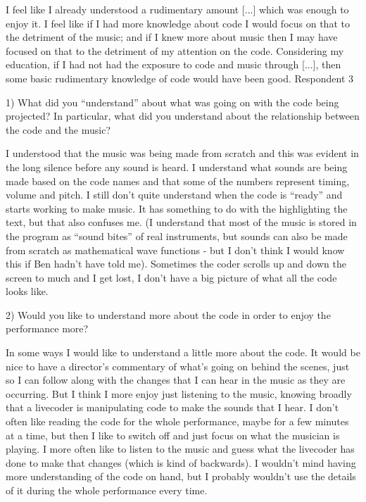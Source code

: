 I feel like I already understood a rudimentary amount [...] which was enough to enjoy it.  I feel like if I had more knowledge about code I would focus on that to the detriment of the music; and if I knew more about music then I may have focused on that to the detriment of my attention on the code.  Considering my education, if I had not had the exposure to code and music through [...], then some basic rudimentary knowledge of code would have been good.
Respondent 3

1) What did you ``understand'' about what was going on with the code being projected? In particular, what did you understand about the relationship between the code and the music?

I understood that the music was being made from scratch and this was evident in the long silence before any sound is heard. I understand what sounds are being made based on the code names and that some of the numbers represent timing, volume and pitch.  I still don't quite understand when the code is ``ready'' and starts working to make music. It has something to do with the highlighting the text, but that also confuses me. (I understand that most of the music is stored in the program as ``sound bites'' of real instruments, but sounds can also be made from scratch as mathematical wave functions - but I don't think I would know this if Ben hadn't have told me). Sometimes the coder scrolls up and down the screen to much and I get lost, I don't have a big picture of what all the code looks like.

2) Would you like to understand more about the code in order to enjoy the performance more?

In some ways I would like to understand a little more about the code. It would be nice to have a director's commentary of what's going on behind the scenes, just so I can follow along with the changes that I can hear in the music as they are occurring. But I think I more enjoy just listening to the music, knowing broadly that a livecoder is manipulating code to make the sounds that I hear. I don't often like reading the code for the whole performance, maybe for a few minutes at a time, but then I like to switch off and just focus on what the musician is playing. I more often like to listen to the music and guess what the livecoder has done to make that changes (which is kind of backwards). I wouldn't mind having more understanding of the code on hand, but I probably wouldn't use the details of it during the whole performance every time.


